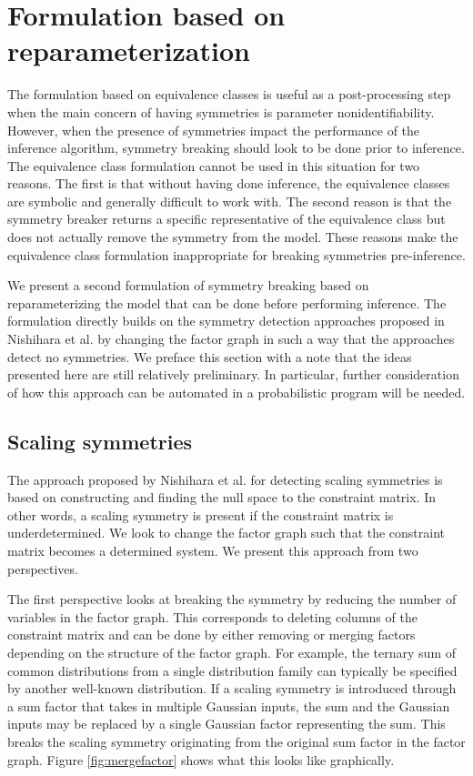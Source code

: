 

\section{Formulation based on reparameterization}

The formulation based on equivalence classes is useful as a post-processing step when the main concern of having symmetries is parameter nonidentifiability. However, when the presence of symmetries impact the performance of the inference algorithm, symmetry breaking should look to be done prior to inference. The equivalence class formulation cannot be used in this situation for two reasons. The first is that without having done inference, the equivalence classes are symbolic and generally difficult to work with. The second reason is that the symmetry breaker returns a specific representative of the equivalence class but does not actually remove the symmetry from the model. These reasons make the equivalence class formulation inappropriate for breaking symmetries pre-inference.

We present a second formulation of symmetry breaking based on reparameterizing the model that can be done before performing inference. The formulation directly builds on the symmetry detection approaches proposed in Nishihara et al. by changing the factor graph in such a way that the approaches detect no symmetries. We preface this section with a note that the ideas presented here are still relatively preliminary. In particular, further consideration of how this approach can be automated in a probabilistic program will be needed.


\subsection{Scaling symmetries}

The approach proposed by Nishihara et al. for detecting scaling symmetries is based on constructing and finding the null space to the constraint matrix. In other words, a scaling symmetry is present if the constraint matrix is underdetermined. We look to change the factor graph such that the constraint matrix becomes a determined system. We present this approach from two perspectives. 

The first perspective looks at breaking the symmetry by reducing the number of variables in the factor graph. This corresponds to deleting columns of the constraint matrix and can be done by either removing or merging factors depending on the structure of the factor graph. For example, the ternary sum of common distributions from a single distribution family can typically be specified by another well-known distribution. If a scaling symmetry is introduced through a sum factor that takes in multiple Gaussian inputs, the sum and the Gaussian inputs may be replaced by a single Gaussian factor representing the sum. This breaks the scaling symmetry originating from the original sum factor in the factor graph. Figure \ref{fig:mergefactor} shows what this looks like graphically.

